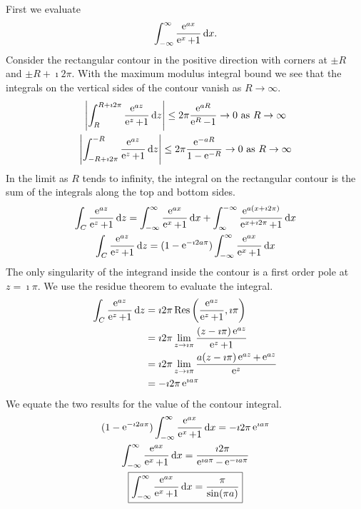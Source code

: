 {%
\begin{Solution}
  \label{solution e ax / (e x + 1)}
  First we evaluate
  \[
  \int_{-\infty}^\infty \frac{\e^{a x}}{\e^x + 1}\,\dd x.
  \]
  Consider the rectangular contour in the positive direction with corners
  at $\pm R$ and $\pm R + \imath 2 \pi$.  With the maximum modulus integral bound
  we see that the integrals on the vertical sides of the contour vanish as 
  $R \to \infty$.
  \begin{gather*}
    \left| \int_R^{R + \imath 2 \pi} \frac{\e^{a z}}{\e^z + 1}\,\dd z \right|
    \leq 2 \pi \frac{\e^{a R}}{\e^R - 1} \to 0\ \mathrm{as}\ R \to \infty \\
    \left| \int_{-R + \imath 2 \pi}^{-R} \frac{\e^{a z}}{\e^z + 1}\,\dd z \right|
    \leq 2 \pi \frac{\e^{-a R}}{1 - \e^{-R}} \to 0\ \mathrm{as}\ R \to \infty
  \end{gather*}
  In the limit as $R$ tends to infinity, the integral on the rectangular
  contour is the sum of the integrals along the top and bottom sides.
  \begin{gather*}
    \int_C \frac{\e^{a z}}{\e^z + 1} \,\dd z = 
    \int_{-\infty}^\infty \frac{\e^{a x}}{\e^x + 1}\,\dd x
    + \int_\infty^{-\infty} \frac{\e^{a (x + \imath 2 \pi)}}{\e^{x + \imath 2 \pi} + 1}\,\dd x \\
    \int_C \frac{\e^{a z}}{\e^z + 1} \,\dd z = 
    (1 - \e^{- \imath 2 a \pi}) \int_{-\infty}^\infty \frac{\e^{a x}}{\e^x + 1}\,\dd x
  \end{gather*}
  The only singularity of the integrand inside the contour is a first order
  pole at $z = \imath \pi$.  We use the residue theorem to evaluate the 
  integral.
  \begin{align*}
    \int_C \frac{\e^{a z}}{\e^z + 1} \,\dd z 
    &= \imath 2 \pi \Res \left( \frac{\e^{a z}}{\e^z + 1}, \imath \pi \right) \\
    &= \imath 2 \pi \lim_{z \to \imath \pi} \frac{(z - \imath \pi) \e^{a z}}{\e^z+1} \\
    &= \imath 2 \pi \lim_{z \to \imath \pi} 
    \frac{a (z - \imath \pi) \e^{a z} + \e^{a z}}{\e^z} \\
    &= - \imath 2 \pi \e^{\imath a \pi}
  \end{align*}
  We equate the two results for the value of the contour integral.
  \begin{gather*}
    (1 - \e^{- \imath 2 a \pi}) \int_{-\infty}^\infty \frac{\e^{a x}}{\e^x + 1} \,\dd x = - \imath 2 \pi \e^{\imath a \pi} \\
    \int_{-\infty}^\infty \frac{\e^{a x}}{\e^x + 1} \,\dd x = \frac{\imath 2 \pi}{\e^{\imath a \pi} - \e^{- \imath a \pi}} \\
    \boxed{
      \int_{-\infty}^\infty \frac{\e^{a x}}{\e^x + 1} \,\dd x = \frac{\pi}{\sin(\pi a)}
      }
  \end{gather*}


\end{Solution}}

